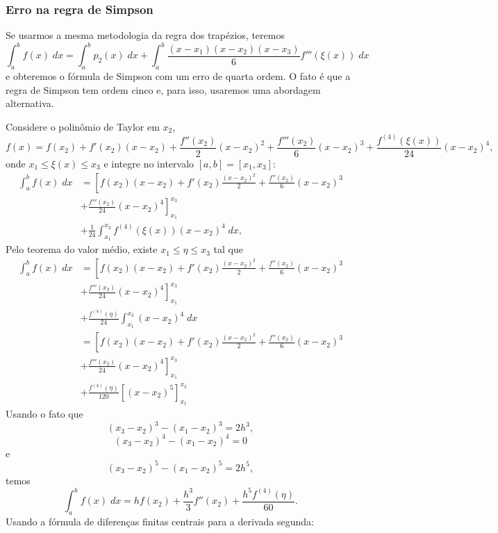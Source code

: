 \subsubsection{Erro na regra de Simpson}
Se usarmos a mesma metodologia da regra dos trapézios, teremos
$$
\int_a^bf(x)\;dx=\int_a^bp_2(x)\;dx+\int_a^b\frac{(x-x_1)(x-x_2)(x-x_3)}{6}f'''(\xi(x))\;dx
$$
e obteremos o fórmula de Simpson com um erro de quarta ordem. O fato é que a regra de Simpson tem ordem cinco e, para isso, usaremos uma abordagem alternativa.

Considere o polinômio de Taylor em $x_2$,
$$
f(x)=f(x_2)+f'(x_2)(x-x_2)+\frac{f''(x_2)}{2}(x-x_2)^2+\frac{f'''(x_2)}{6}(x-x_2)^3+\frac{f^{(4)}(\xi(x))}{24}(x-x_2)^4,
$$
onde $x_1\leq\xi(x)\leq x_3$ e integre no intervalo $[a,b]=[x_1,x_3]$:
\begin{equation*}
  \begin{split}
    \int_a^bf(x)\;dx&= \left[f(x_2)(x-x_2)+f'(x_2)\frac{(x-x_2)^2}{2} + \frac{f''(x_2)}{6}(x-x_2)^3\right. \\
      &\left. + \frac{f'''(x_2)}{24}(x-x_2)^4\right]_{x_1}^{x_3}\\
      &+ \frac{1}{24}\int_{x_1}^{x_3}f^{(4)}(\xi(x))(x-x_2)^4\;dx,    
  \end{split}
\end{equation*}
Pelo teorema do valor médio, existe $x_1\leq\eta\leq x_3$ tal que
\begin{equation*}
  \begin{split}
    \int_a^bf(x)\;dx&= \left[f(x_2)(x-x_2)+f'(x_2)\frac{(x-x_2)^2}{2}+\frac{f''(x_2)}{6}(x-x_2)^3\right.\\
    &+\left.\frac{f'''(x_2)}{24}(x-x_2)^4\right]_{x_1}^{x_3}\\
    &+ \frac{f^{(4)}(\eta)}{24}\int_{x_1}^{x_3}(x-x_2)^4\;dx\\
    &= \left[f(x_2)(x-x_2)+f'(x_2)\frac{(x-x_2)^2}{2}+\frac{f''(x_2)}{6}(x-x_2)^3\right.\\
    &+\left.\frac{f'''(x_2)}{24}(x-x_2)^4\right]_{x_1}^{x_3}\\
    &+ \frac{f^{(4)}(\eta)}{120}\left[(x-x_2)^5\right]_{x_1}^{x_3}    
  \end{split}
\end{equation*}
Usando o fato que
$$
(x_3-x_2)^3-(x_1-x_2)^3=2h^3,
$$
$$
(x_3-x_2)^4-(x_1-x_2)^4=0
$$
e
$$
(x_3-x_2)^5-(x_1-x_2)^5=2h^5,
$$
temos
$$
\int_a^bf(x)\;dx=hf(x_2)+\frac{h^3}{3}f''(x_2)+\frac{h^5f^{(4)}(\eta)}{60}.
$$
Usando a fórmula de diferenças finitas centrais para a derivada segunda:
